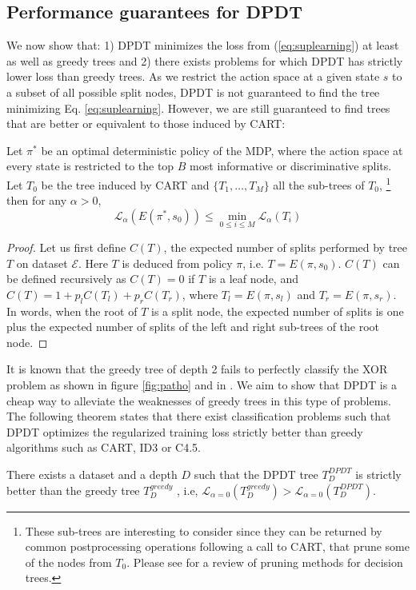 \subsection{Performance guarantees for DPDT}
We now show that: 1) DPDT minimizes the loss from (\ref{eq:suplearning}) at least as well as greedy trees and 2) there exists problems for which DPDT has strictly lower loss than greedy trees. 
As we restrict the action space at a given state $s$ to a subset of all possible split nodes, DPDT is not guaranteed to find the tree minimizing Eq. \ref{eq:suplearning}. However, we are still guaranteed to find trees that are better or equivalent to those induced by CART:
\begin{theorem}\label{prop:cart}
Let $\pi^*$ be an optimal deterministic policy of the MDP, where the action space at every state is restricted to the top $B$ most informative or discriminative splits. 
Let $T_0$ be the tree induced by CART and $\{T_1,\dots,T_M\}$ all the sub-trees of $T_0$, \footnote{These sub-trees are interesting to consider since they can be returned by common postprocessing operations following a call to CART, that prune some of the nodes from $T_0$. Please see \cite{pruning1} for a review of pruning methods for decision trees.} then for any $\alpha > 0$, 
\[
{\mathcal L}_\alpha(E(\pi^*, s_0)) \leq \min_{0\leq i\leq M}{\mathcal L}_\alpha(T_i)
\]
\end{theorem}

\begin{proof}
Let us first define $C(T)$, the expected number of splits performed by tree $T$ on dataset $\mathcal E$. 
Here $T$ is deduced from policy $\pi$, i.e. $T=E(\pi, s_0)$. $C(T)$ can be defined recursively as $C(T) = 0$ if $T$ is a leaf node, and $C(T) = 1 + p_l C(T_l) + p_r  C(T_r)$, where $T_l = E(\pi, s_l)$ and $T_r = E(\pi, s_r)$. 
In words, when the root of $T$ is a split node, the expected number of splits is one plus the expected number of splits of the left and right sub-trees of the root node.
\end{proof}

It is known that the greedy tree of depth 2 fails to perfectly classify the XOR problem as shown in figure \ref{fig:patho} and in \cite{Murthy,how-eff}. We aim to show that DPDT is a cheap way to alleviate the weaknesses of greedy trees in this type of problems. The following theorem states that there exist classification problems such that DPDT optimizes the regularized training loss strictly better than greedy algorithms such as CART, ID3 or C4.5.
\begin{theorem}\label{thm:better_greedy}
There exists a dataset and a depth $D$ such that the DPDT tree $T^{DPDT}_D$ is strictly better than the greedy tree $T^{greedy}_{D}$ , i.e, $\mathcal{L}_{\alpha=0}(T^{greedy}_{D}) > \mathcal{L}_{\alpha=0}(T^{DPDT}_{D})$.
\end{theorem}

